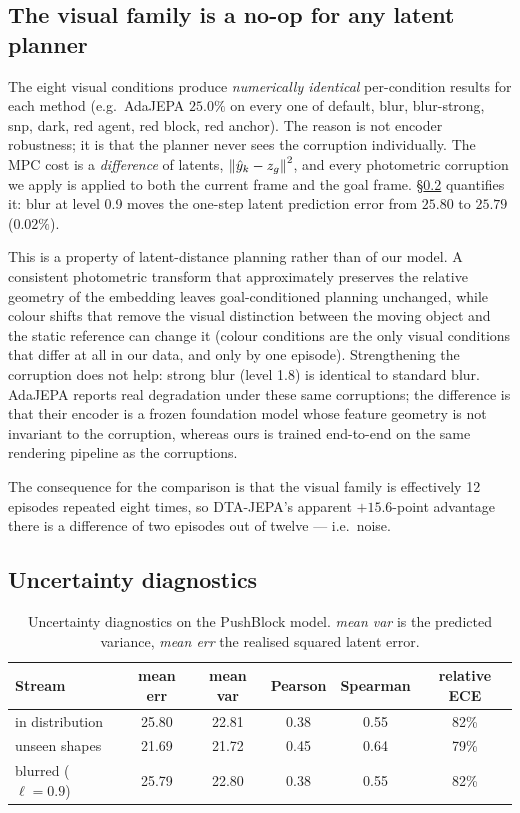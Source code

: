 \subsection{The visual family is a no-op for any latent planner}\label{sec:noop}

The eight visual conditions produce \emph{numerically identical} per-condition results for each
method (e.g.\ AdaJEPA $25.0\%$ on every one of default, blur, blur-strong, snp, dark, red
agent, red block, red anchor). The reason is not encoder robustness; it is that the planner
never sees the corruption individually. The MPC cost is a \emph{difference} of latents,
$\left\lVert \hat{y}_k - z_g \right\rVert^2$, and every photometric corruption we apply is applied to both the
current frame and the goal frame. \S\ref{sec:calibres} quantifies it: blur at level 0.9 moves
the one-step latent prediction error from $25.80$ to $25.79$ ($0.02\%$).

This is a property of latent-distance planning rather than of our model. A consistent
photometric transform that approximately preserves the relative geometry of the embedding
leaves goal-conditioned planning unchanged, while colour shifts that remove the visual
distinction between the moving object and the static reference can change it (colour conditions
are the only visual conditions that differ at all in our data, and only by one episode).
Strengthening the corruption does not help: strong blur (level 1.8) is identical to standard
blur. AdaJEPA reports real degradation under these same corruptions; the difference is that
their encoder is a frozen foundation model whose feature geometry is not invariant to the
corruption, whereas ours is trained end-to-end on the same rendering pipeline as the
corruptions.

The consequence for the comparison is that the visual family is effectively 12 episodes
repeated eight times, so DTA-JEPA's apparent $+15.6$-point advantage there is a difference of
two episodes out of twelve --- i.e.\ noise.

\subsection{Uncertainty diagnostics}\label{sec:calibres}

\begin{table}[t]
\centering
\caption{Uncertainty diagnostics on the PushBlock model. \emph{mean var} is the predicted
variance, \emph{mean err} the realised squared latent error.}
\label{tab:calib}
\begin{tabular}{lccccc}
\toprule
Stream & mean err & mean var & Pearson & Spearman & relative ECE \\
\midrule
in distribution & 25.80 & 22.81 & 0.38 & 0.55 & 82\% \\
unseen shapes   & 21.69 & 21.72 & 0.45 & 0.64 & 79\% \\
blurred ($\ell=0.9$) & 25.79 & 22.80 & 0.38 & 0.55 & 82\% \\
\bottomrule
\end{tabular}
\end{table}

